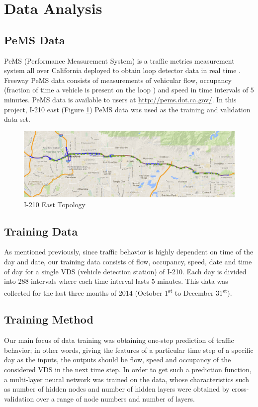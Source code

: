 \documentclass[twocolumn,10pt]{asme2e}
\begin{document}
\section{Data Analysis}
\subsection{PeMS Data} 
PeMS (Performance Measurement System) is a traffic metrics measurement system all over California deployed to obtain loop detector data in real time \cite{PemsPravin}. Freeway PeMS data consists of measurements of vehicular flow, occupancy (fraction of time a vehicle is present on the loop \cite{occupancy}) and speed in time intervals of $5$ minutes. PeMS data is available to users at \url{http://pems.dot.ca.gov/}. In this project, I-210 east (Figure \ref{fig:210}) PeMS data was used as the training and validation data set. 
\begin{figure}[h]
    \centering
    \includegraphics[width=1\linewidth]{210.png}
    \caption{I-210 East Topology}
    \label{fig:210}
\end{figure} 


\subsection{Training Data}

As mentioned previously, since traffic behavior is highly dependent on time of the day and date, our training data consists of flow, occupancy, speed, date and time of day for a single VDS (vehicle detection station) of I-210. Each day is divided into 288 intervals where each time interval lasts $5$ minutes. This data was collected for the last three months of 2014 (October 1\textsuperscript{st} to December 31\textsuperscript{st}).
\subsection{Training Method}
Our main focus of data training was obtaining one-step prediction of traffic behavior; in other words, giving the features of a particular time step of a specific day as the inputs, the outputs should be flow, speed and occupancy of the considered VDS in the next time step. In order to get such a prediction function, a multi-layer neural network was trained on the data, whose characteristics such as number of hidden nodes and number of hidden layers were obtained by cross-validation over a range of node numbers and number of layers.
\end{document}
